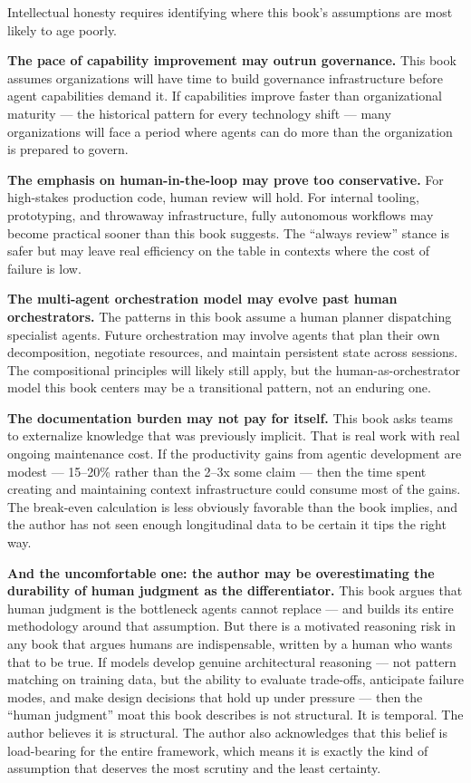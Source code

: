 \documentclass[
  a4paper,
  DIV=11,
  numbers=noendperiod]{scrreprt}
\begin{document}
Intellectual honesty requires identifying where this book's assumptions
are most likely to age poorly.

\textbf{The pace of capability improvement may outrun governance.} This
book assumes organizations will have time to build governance
infrastructure before agent capabilities demand it. If capabilities
improve faster than organizational maturity --- the historical pattern
for every technology shift --- many organizations will face a period
where agents can do more than the organization is prepared to govern.

\textbf{The emphasis on human-in-the-loop may prove too conservative.}
For high-stakes production code, human review will hold. For internal
tooling, prototyping, and throwaway infrastructure, fully autonomous
workflows may become practical sooner than this book suggests. The
``always review'' stance is safer but may leave real efficiency on the
table in contexts where the cost of failure is low.

\textbf{The multi-agent orchestration model may evolve past human
orchestrators.} The patterns in this book assume a human planner
dispatching specialist agents. Future orchestration may involve agents
that plan their own decomposition, negotiate resources, and maintain
persistent state across sessions. The compositional principles will
likely still apply, but the human-as-orchestrator model this book
centers may be a transitional pattern, not an enduring one.

\textbf{The documentation burden may not pay for itself.} This book asks
teams to externalize knowledge that was previously implicit. That is
real work with real ongoing maintenance cost. If the productivity gains
from agentic development are modest --- 15--20\% rather than the 2--3x
some claim --- then the time spent creating and maintaining context
infrastructure could consume most of the gains. The break-even
calculation is less obviously favorable than the book implies, and the
author has not seen enough longitudinal data to be certain it tips the
right way.

\textbf{And the uncomfortable one: the author may be overestimating the
durability of human judgment as the differentiator.} This book argues
that human judgment is the bottleneck agents cannot replace --- and
builds its entire methodology around that assumption. But there is a
motivated reasoning risk in any book that argues humans are
indispensable, written by a human who wants that to be true. If models
develop genuine architectural reasoning --- not pattern matching on
training data, but the ability to evaluate trade-offs, anticipate
failure modes, and make design decisions that hold up under pressure ---
then the ``human judgment'' moat this book describes is not structural.
It is temporal. The author believes it is structural. The author also
acknowledges that this belief is load-bearing for the entire framework,
which means it is exactly the kind of assumption that deserves the most
scrutiny and the least certainty.
\end{document}
